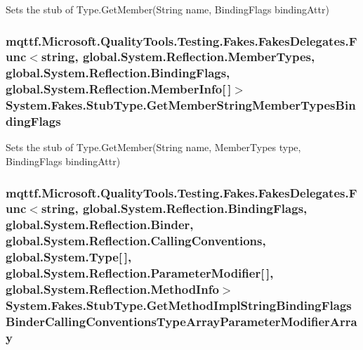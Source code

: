 Sets the stub of Type.\-Get\-Member(\-String name, Binding\-Flags binding\-Attr)

\hypertarget{class_system_1_1_fakes_1_1_stub_type_a2d8f3b85471d5da524cfd9ae637b2667}{
\subsubsection[{Get\-Member\-String\-Member\-Types\-Binding\-Flags}]{\setlength{\rightskip}{0pt plus 5cm}mqttf.\-Microsoft.\-Quality\-Tools.\-Testing.\-Fakes.\-Fakes\-Delegates.\-Func$<$string, global.\-System.\-Reflection.\-Member\-Types, global.\-System.\-Reflection.\-Binding\-Flags, global.\-System.\-Reflection.\-Member\-Info\mbox{[}$\,$\mbox{]}$>$ System.\-Fakes.\-Stub\-Type.\-Get\-Member\-String\-Member\-Types\-Binding\-Flags}}\label{class_system_1_1_fakes_1_1_stub_type_a2d8f3b85471d5da524cfd9ae637b2667}


Sets the stub of Type.\-Get\-Member(\-String name, Member\-Types type, Binding\-Flags binding\-Attr)

\hypertarget{class_system_1_1_fakes_1_1_stub_type_a4110ef59e8f9fefaaafaac6d97ef71ab}{
\subsubsection[{Get\-Method\-Impl\-String\-Binding\-Flags\-Binder\-Calling\-Conventions\-Type\-Array\-Parameter\-Modifier\-Array}]{\setlength{\rightskip}{0pt plus 5cm}mqttf.\-Microsoft.\-Quality\-Tools.\-Testing.\-Fakes.\-Fakes\-Delegates.\-Func$<$string, global.\-System.\-Reflection.\-Binding\-Flags, global.\-System.\-Reflection.\-Binder, global.\-System.\-Reflection.\-Calling\-Conventions, global.\-System.\-Type\mbox{[}$\,$\mbox{]}, global.\-System.\-Reflection.\-Parameter\-Modifier\mbox{[}$\,$\mbox{]}, global.\-System.\-Reflection.\-Method\-Info$>$ System.\-Fakes.\-Stub\-Type.\-Get\-Method\-Impl\-String\-Binding\-Flags\-Binder\-Calling\-Conventions\-Type\-Array\-Parameter\-Modifier\-Array}}\label{class_system_1_1_fakes_1_1_stub_type_a4110ef59e8f9fefaaafaac6d97ef71ab}


